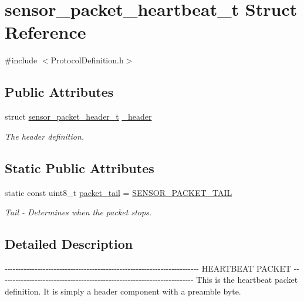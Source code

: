 \hypertarget{structsensor__packet__heartbeat__t}{\section{sensor\-\_\-packet\-\_\-heartbeat\-\_\-t \-Struct \-Reference}
\label{structsensor__packet__heartbeat__t}
}


{\ttfamily \#include $<$\-Protocol\-Definition.\-h$>$}

\subsection*{\-Public \-Attributes}
\begin{DoxyCompactItemize}
\item 
struct \hyperlink{structsensor__packet__header__t}{sensor\-\_\-packet\-\_\-header\-\_\-t} \hyperlink{structsensor__packet__heartbeat__t_a385dff0d2b057f0b15a127253dd9cfd3}{\-\_\-header}
\begin{DoxyCompactList}\small\item\em \-The header definition. \end{DoxyCompactList}\end{DoxyCompactItemize}
\subsection*{\-Static \-Public \-Attributes}
\begin{DoxyCompactItemize}
\item 
static const uint8\-\_\-t \hyperlink{structsensor__packet__heartbeat__t_afc573667875c2ca9d9a81dbcc0e53052}{packet\-\_\-tail} = \hyperlink{_protocol_definition_8h_aba63cacf112bcb4c2ac7ffaeb1454114}{\-S\-E\-N\-S\-O\-R\-\_\-\-P\-A\-C\-K\-E\-T\-\_\-\-T\-A\-I\-L}
\begin{DoxyCompactList}\small\item\em \-Tail -\/ \-Determines when the packet stops. \end{DoxyCompactList}\end{DoxyCompactItemize}


\subsection{\-Detailed \-Description}
-\/-\/-\/-\/-\/-\/-\/-\/-\/-\/-\/-\/-\/-\/-\/-\/-\/-\/-\/-\/-\/-\/-\/-\/-\/-\/-\/-\/-\/-\/-\/-\/-\/-\/-\/-\/-\/-\/-\/-\/-\/-\/-\/-\/-\/-\/-\/-\/-\/-\/-\/-\/-\/-\/-\/-\/-\/-\/-\/-\/-\/-\/-\/-\/-\/-\/-\/-\/-\/-\/-\/ \-H\-E\-A\-R\-T\-B\-E\-A\-T \-P\-A\-C\-K\-E\-T -\/-\/-\/-\/-\/-\/-\/-\/-\/-\/-\/-\/-\/-\/-\/-\/-\/-\/-\/-\/-\/-\/-\/-\/-\/-\/-\/-\/-\/-\/-\/-\/-\/-\/-\/-\/-\/-\/-\/-\/-\/-\/-\/-\/-\/-\/-\/-\/-\/-\/-\/-\/-\/-\/-\/-\/-\/-\/-\/-\/-\/-\/-\/-\/-\/-\/-\/-\/-\/-\/-\/ \-This is the heartbeat packet definition. \-It is simply a header component with a preamble byte. 


